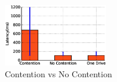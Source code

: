 \begin{figure}[t]
      \includegraphics[width=0.40\textwidth]{plots/contention_bar}
      \caption{Contention vs No Contention}
      \label{fig:gizacontentionbar}
\end{figure}

